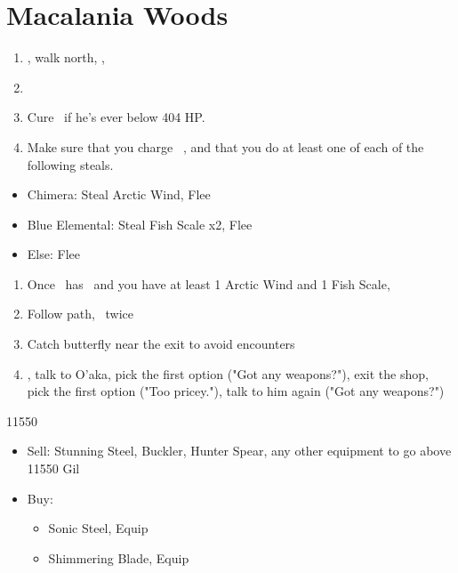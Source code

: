 \chapter{Macalania Woods}

\begin{enumerate}
    \item \sd, walk north, \sd, \save
    \item \formation{\tidus}{\rikku}{\auron}
    \item Cure \tidus\ if he's ever below 404 HP.
    \item Make sure that you charge \rikku\ \od, and that you do at least one of each of the following steals.
\end{enumerate}
\begin{encounters}
    \begin{itemize}
        \item Chimera: Steal Arctic Wind, Flee
        \item Blue Elemental: Steal Fish Scale x2, Flee
        \item Else: Flee
    \end{itemize}
\end{encounters}
\begin{enumerate}[resume]
    \item Once \rikku\ has \od\ and you have at least 1 Arctic Wind and 1 Fish Scale, \formation{\tidus}{\kimahri}{\auron}
    \item Follow path, \sd\ twice
    \item Catch butterfly near the exit to avoid encounters
    \formation{\tidus}{\kimahri}{\auron}
    \item \save, talk to O'aka, pick the first option ("Got any weapons?"), exit the shop, pick the first option ("Too pricey."), talk to him again ("Got any weapons?")
\end{enumerate}
\begin{shop}{11550}
    \begin{itemize}
        \item Sell: Stunning Steel, Buckler, Hunter Spear, any other equipment to go above 11550 Gil
        \item Buy:
        \begin{itemize}
            \item Sonic Steel, Equip
            \item Shimmering Blade, Equip
        \end{itemize}
    \end{itemize}
\end{shop}
